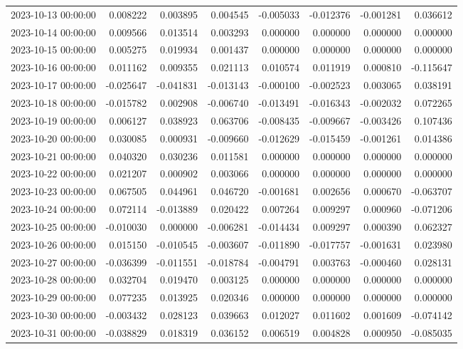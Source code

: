 \begin{tabular}{lrrrrrrr}
2023-10-13 00:00:00 & 0.008222 & 0.003895 & 0.004545 & -0.005033 & -0.012376 & -0.001281 & 0.036612 \\
2023-10-14 00:00:00 & 0.009566 & 0.013514 & 0.003293 & 0.000000 & 0.000000 & 0.000000 & 0.000000 \\
2023-10-15 00:00:00 & 0.005275 & 0.019934 & 0.001437 & 0.000000 & 0.000000 & 0.000000 & 0.000000 \\
2023-10-16 00:00:00 & 0.011162 & 0.009355 & 0.021113 & 0.010574 & 0.011919 & 0.000810 & -0.115647 \\
2023-10-17 00:00:00 & -0.025647 & -0.041831 & -0.013143 & -0.000100 & -0.002523 & 0.003065 & 0.038191 \\
2023-10-18 00:00:00 & -0.015782 & 0.002908 & -0.006740 & -0.013491 & -0.016343 & -0.002032 & 0.072265 \\
2023-10-19 00:00:00 & 0.006127 & 0.038923 & 0.063706 & -0.008435 & -0.009667 & -0.003426 & 0.107436 \\
2023-10-20 00:00:00 & 0.030085 & 0.000931 & -0.009660 & -0.012629 & -0.015459 & -0.001261 & 0.014386 \\
2023-10-21 00:00:00 & 0.040320 & 0.030236 & 0.011581 & 0.000000 & 0.000000 & 0.000000 & 0.000000 \\
2023-10-22 00:00:00 & 0.021207 & 0.000902 & 0.003066 & 0.000000 & 0.000000 & 0.000000 & 0.000000 \\
2023-10-23 00:00:00 & 0.067505 & 0.044961 & 0.046720 & -0.001681 & 0.002656 & 0.000670 & -0.063707 \\
2023-10-24 00:00:00 & 0.072114 & -0.013889 & 0.020422 & 0.007264 & 0.009297 & 0.000960 & -0.071206 \\
2023-10-25 00:00:00 & -0.010030 & 0.000000 & -0.006281 & -0.014434 & 0.009297 & 0.000390 & 0.062327 \\
2023-10-26 00:00:00 & 0.015150 & -0.010545 & -0.003607 & -0.011890 & -0.017757 & -0.001631 & 0.023980 \\
2023-10-27 00:00:00 & -0.036399 & -0.011551 & -0.018784 & -0.004791 & 0.003763 & -0.000460 & 0.028131 \\
2023-10-28 00:00:00 & 0.032704 & 0.019470 & 0.003125 & 0.000000 & 0.000000 & 0.000000 & 0.000000 \\
2023-10-29 00:00:00 & 0.077235 & 0.013925 & 0.020346 & 0.000000 & 0.000000 & 0.000000 & 0.000000 \\
2023-10-30 00:00:00 & -0.003432 & 0.028123 & 0.039663 & 0.012027 & 0.011602 & 0.001609 & -0.074142 \\
2023-10-31 00:00:00 & -0.038829 & 0.018319 & 0.036152 & 0.006519 & 0.004828 & 0.000950 & -0.085035 \\

\end{tabular}
